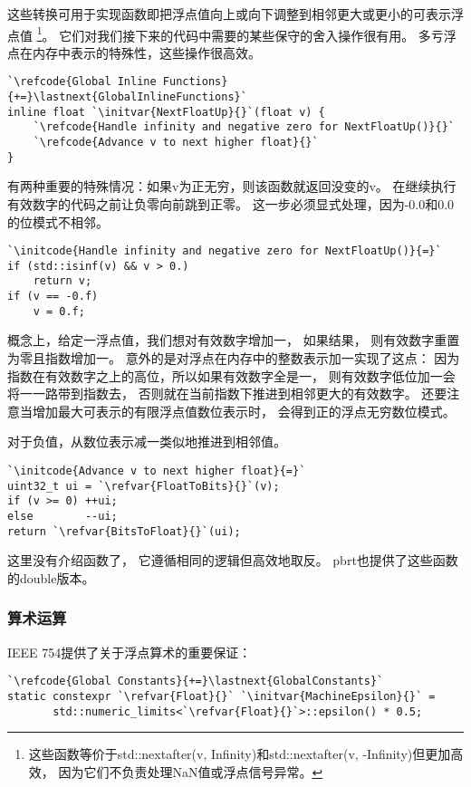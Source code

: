 这些转换可用于实现函数即把浮点值向上或向下调整到相邻更大或更小的可表示浮点值
\footnote{这些函数等价于{\ttfamily std::nextafter(v, Infinity)}和{\ttfamily std::nextafter(v, -Infinity)}但更加高效，
因为它们不负责处理NaN值或浮点信号异常。}。
它们对我们接下来的代码中需要的某些保守的舍入操作很有用。
多亏浮点在内存中表示的特殊性，这些操作很高效。
\begin{lstlisting}
`\refcode{Global Inline Functions}{+=}\lastnext{GlobalInlineFunctions}`
inline float `\initvar{NextFloatUp}{}`(float v) {
    `\refcode{Handle infinity and negative zero for NextFloatUp()}{}`
    `\refcode{Advance v to next higher float}{}`
}
\end{lstlisting}

有两种重要的特殊情况：如果{\ttfamily v}为正无穷，则该函数就返回没变的{\ttfamily v}。
在继续执行有效数字的代码之前让负零向前跳到正零。
这一步必须显式处理，因为-0.0和0.0的位模式不相邻。
\begin{lstlisting}
`\initcode{Handle infinity and negative zero for NextFloatUp()}{=}`
if (std::isinf(v) && v > 0.)
    return v;
if (v == -0.f)
    v = 0.f;
\end{lstlisting}

概念上，给定一浮点值，我们想对有效数字增加一，
如果结果，
则有效数字重置为零且指数增加一。
意外的是对浮点在内存中的整数表示加一实现了这点：
因为指数在有效数字之上的高位，所以如果有效数字全是一，
则有效数字低位加一会将一一路带到指数去，
否则就在当前指数下推进到相邻更大的有效数字。
还要注意当增加最大可表示的有限浮点值数位表示时，
会得到正的浮点无穷数位模式。

对于负值，从数位表示减一类似地推进到相邻值。
\begin{lstlisting}
`\initcode{Advance v to next higher float}{=}`
uint32_t ui = `\refvar{FloatToBits}{}`(v);
if (v >= 0) ++ui;
else        --ui;
return `\refvar{BitsToFloat}{}`(ui);
\end{lstlisting}

这里没有介绍函数了，
它遵循相同的逻辑但高效地取反。
pbrt也提供了这些函数的{\ttfamily double}版本。

\subsubsection*{算术运算}
IEEE 754提供了关于浮点算术的重要保证：
\begin{lstlisting}
`\refcode{Global Constants}{+=}\lastnext{GlobalConstants}`
static constexpr `\refvar{Float}{}` `\initvar{MachineEpsilon}{}` =
       std::numeric_limits<`\refvar{Float}{}`>::epsilon() * 0.5;
\end{lstlisting}

